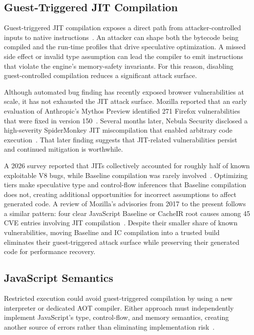 \documentclass[sigplan,screen,review,anonymous]{acmart}
\begin{document}
\subsection{Guest-Triggered JIT Compilation}

Guest-triggered JIT compilation exposes a direct path from attacker-controlled inputs to native instructions~\cite{niu2014rockjit}. An attacker can shape both the bytecode being compiled and the run-time profiles that drive speculative optimization. A missed side effect or invalid type assumption can lead the compiler to emit instructions that violate the engine's memory-safety invariants. For this reason, disabling guest-controlled compilation reduces a significant attack surface.

Although automated bug finding has recently exposed browser vulnerabilities at scale, it has not exhausted the JIT attack surface. Mozilla reported that an early evaluation of Anthropic's Mythos Preview identified 271 Firefox vulnerabilities that were fixed in version 150~\cite{holley2026zerodays}. Several months later, Nebula Security disclosed a high-severity SpiderMonkey JIT miscompilation that enabled arbitrary code execution~\cite{mozilla2026cve10702, nebula2026ionstack}. That later finding suggests that JIT-related vulnerabilities persist and continued mitigation is worthwhile.

A 2026 survey reported that JITs collectively accounted for roughly half of known exploitable V8 bugs, while Baseline compilation was rarely involved~\cite{gross2026state}. Optimizing tiers make speculative type and control-flow inferences that Baseline compilation does not, creating additional opportunities for incorrect assumptions to affect generated code. A review of Mozilla's advisories from 2017 to the present follows a similar pattern: four clear JavaScript Baseline or CacheIR root causes among 45 CVE entries involving JIT compilation~\cite{mozilla2026securityadvisories}. Despite their smaller share of known vulnerabilities, moving Baseline and IC compilation into a trusted build eliminates their guest-triggered attack surface while preserving their generated code for performance recovery.



\subsection{JavaScript Semantics}

Restricted execution could avoid guest-triggered compilation by using a new interpreter or dedicated AOT compiler. Either approach must independently implement JavaScript's type, control-flow, and memory semantics, creating another source of errors rather than eliminating implementation risk~\cite{wang2026enhancedinsecurity}.
\end{document}

